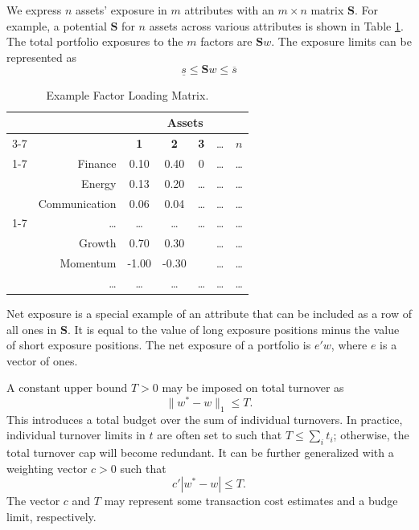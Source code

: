 \documentclass[11pt, letterpaper]{article}
\begin{document}
We express $n$ assets' exposure in $m$ attributes with an $m\times n$ matrix $\mathbf{S}$. For example, a potential $\mathbf{S}$
for $n$ assets across various attributes is shown in Table \ref{example_attribute_matrix}.  The total portfolio exposures to the
$m$ factors are $\mathbf{S}w$. The exposure limits can be represented as
\begin{equation}
    \underline{s} \leq \mathbf{S}w \leq \overline{s}
\end{equation}

\begin{table}[t]
\label{example_attribute_matrix}
\centering
    \caption{Example Factor Loading Matrix.}
    \vspace{0.3cm}
    \begin{tabular}{cr *{5}{c}}
        \toprule
        & & \multicolumn{5}{c}{\textbf{Assets}} \\
        \cmidrule(lr){3-7}
        & & \textbf{1} & \textbf{2} & \textbf{3} & \dots & \textbf{$n$} \\
        \cmidrule(lr){1-7}
        & Finance & 0.10 & 0.40 & 0 &\dots & \dots \\
        & Energy & 0.13 & 0.20 & \dots & \dots & \dots \\
        & Communication & 0.06 & 0.04 & \dots & \dots & \dots \\
        \cmidrule(lr){1-7}
        & \dots & \dots & \dots & \dots & \dots & \dots \\
        & Growth & 0.70 & 0.30 & & \dots & \dots \\
        & Momentum & -1.00 & -0.30 & & \dots & \dots \\
        & \dots & \dots & \dots & \dots & \dots & \dots \\
        \bottomrule
    \end{tabular}
\end{table}

Net exposure is a special example of an attribute that can be included as a row of all ones in $\mathbf{S}$. It is equal to the
value of long exposure positions minus the value of short exposure positions. The net exposure of a portfolio is $e' w$, where
$e$ is a vector of ones.

A constant upper bound $T > 0$ may be imposed on total turnover as
\begin{equation}
  \label{unedited_total_turnover}
	\lVert w^* - w\rVert_1 \leq T.
\end{equation}
This introduces a total budget over the sum of individual turnovers. In practice, individual turnover limits in $t$ are often
set to such that $T \leq \sum_i t_i$; otherwise, the total turnover cap will become redundant. It can be further generalized
with a weighting vector $c > 0$ such that
\begin{equation*}
	c' |w^* - w| \leq T.
\end{equation*}
The vector $c$ and $T$ may represent some transaction cost estimates and a budge limit, respectively.
\end{document}
